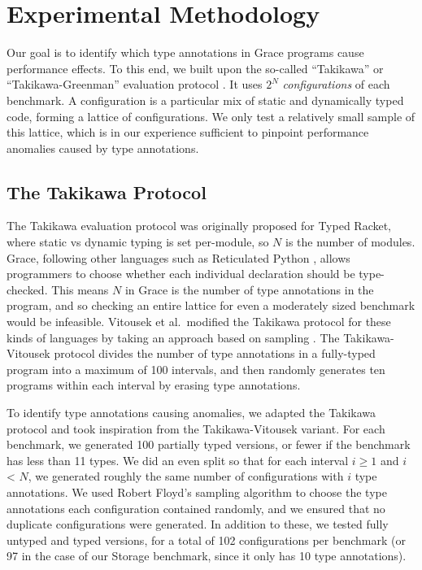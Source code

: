 \documentclass[sigplan,10pt,review,screen]{acmart}\settopmatter{printfolios=true}
\begin{document}
\section{Experimental Methodology}

Our goal is to identify which type annotations in Grace programs
cause performance effects.
To this end, we built upon the so-called ``Takikawa'' or ``Takikawa-Greenman'' evaluation protocol \cite{Takikawa2016,Greenman2019jfp}.
It uses $2^N$ \emph{configurations} of each benchmark.
A configuration is a particular mix of static and dynamically typed code, forming a lattice of configurations.
We only test a relatively small sample of this lattice,
which is in our experience sufficient to pinpoint performance anomalies caused
by type annotations.

\subsection{The Takikawa Protocol}
The Takikawa evaluation protocol was originally proposed for Typed
Racket, where static vs dynamic typing is set per-module, so $N$ is
the number of modules. Grace, following other languages such as
Reticulated Python \cite{reticPython2014,monotonic2015,Vitousek2017},
allows programmers to choose whether each individual declaration should be type-checked. This means $N$ in Grace is the number of type annotations in the program, and so
checking an entire lattice for even a moderately sized benchmark would be infeasible.  Vitousek et al.\ modified the Takikawa protocol for
these kinds of languages by taking an approach based on sampling
\cite{vitousek-transient-arXive-2019}.  The Takikawa-Vitousek protocol
divides the number of type annotations in a fully-typed program into
a maximum of 100 intervals, and then randomly generates ten programs within
each interval by erasing type annotations.


To identify type annotations causing anomalies,
we adapted the Takikawa protocol
and took inspiration from the Takikawa-Vitousek variant.
For each benchmark, we generated 100 partially typed versions,
or fewer if the benchmark has less than 11 types.
We did an even split so that for each interval $i \ge 1$ and $i$ < $N$, we generated roughly the same number of configurations with $i$ type annotations. We used Robert Floyd's sampling algorithm \cite{Bentley:1987:PPS:30401.315746} to choose the type annotations each configuration contained randomly, and we ensured that no duplicate configurations were generated. In addition to these, we tested fully untyped and typed versions, for a total of 102 configurations per benchmark (or 97 in the case of our Storage benchmark, since it only has 10 type annotations).
\end{document}
